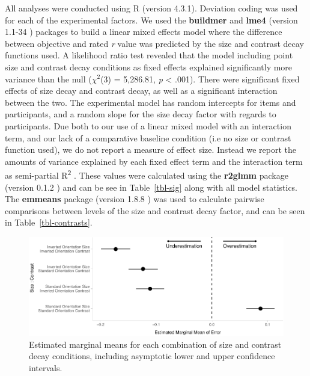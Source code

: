 \documentclass[manuscript, review, anonymous, screen]{acmart}
\begin{document}
All analyses were conducted using R (version 4.3.1). Deviation coding
was used for each of the experimental factors. We used the
\textbf{buildmer} and \textbf{lme4} (version 1.1-34 \citep{lme4})
packages to build a linear mixed effects model where the difference
between objective and rated \emph{r} value was predicted by the size and
contrast decay functions used. A likelihood ratio test revealed that the
model including point size and contrast decay conditions as fixed
effects explained significantly more variance than the null
(\(\chi^2\)(3) = 5,286.81, \emph{p} \textless{} .001). There were
significant fixed effects of size decay and contrast decay, as well as a
significant interaction between the two. The experimental model has
random intercepts for items and participants, and a random slope for the
size decay factor with regards to participants. Due both to our use of a
linear mixed model with an interaction term, and our lack of a
comparative baseline condition (i.e no size or contrast function used),
we do not report a measure of effect size. Instead we report the amounts
of variance explained by each fixed effect term and the interaction term
as semi-partial R\textsuperscript{2} \citep{nakagawa_2013}. These values
were calculated using the \textbf{r2glmm} package (version 0.1.2
\citep{r2glmm}) and can be see in Table~\ref{tbl-sig} along with all
model statistics. The \textbf{emmeans} package (version 1.8.8
\citep{emmeans}) was used to calculate pairwise comparisons between
levels of the size and contrast decay factor, and can be seen in
Table~\ref{tbl-contrasts}.

\begin{figure}

{\centering \includegraphics[width=1\textwidth,height=\textheight]{size_and_contrast_files/figure-pdf/fig-emm-plot-1.pdf}

}

\caption{\label{fig-emm-plot}Estimated marginal means for each
combination of size and contrast decay conditions, including asymptotic
lower and upper confidence intervals.}
\end{figure}
\end{document}
